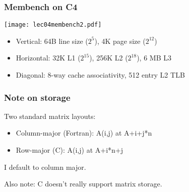 \documentclass{beamer}
\begin{document}
\begin{frame}
  \frametitle{Membench on C4}
  \begin{center}
    \texttt{[image: lec04membench2.pdf]}
  \end{center}

  \begin{itemize}
    \item Vertical: 64B line size ($2^5$), 4K page size ($2^{12}$)
    \item Horizontal: 32K L1 ($2^{15}$), 256K L2 ($2^{18}$), 6 MB L3
    \item Diagonal: 8-way cache associativity, 512 entry L2 TLB
  \end{itemize}
\end{frame}


\begin{frame}
  \frametitle{Note on storage}

  \begin{center}
  \end{center}

  Two standard matrix layouts:
  \begin{itemize}
  \item Column-major (Fortran): A(i,j) at A+i+j*n
  \item Row-major (C): A(i,j) at A+i*n+j
  \end{itemize}
  I default to column major.

  \vspace{3mm}
  Also note: C doesn't really support matrix storage.

\end{frame}
\end{document}
